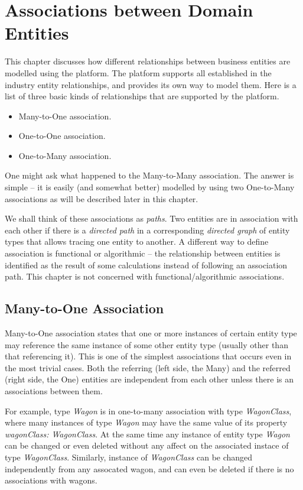\chapter{Associations between Domain Entities}\label{ch01:02}

  This chapter discusses how different relationships between business entities are modelled using the platform.
  The platform supports all established in the industry entity relationships, and provides its own way to model them. 
  Here is a list of three basic kinds of relationships that are supported by the platform.
  \begin{itemize}
    \item Many-to-One association.
    \item One-to-One association.
    \item One-to-Many association.
  \end{itemize}

  One might ask what happened to the Many-to-Many association. 
  The answer is simple -- it is easily (and somewhat better) modelled by using two One-to-Many associations as will be described later in this chapter.

  We shall think of these associations as \emph{paths}.
  Two entities are in association with each other if there is a \emph{directed path} in a corresponding \emph{directed graph} of entity types that allows tracing one entity to another. 
  A different way to define association is functional or algorithmic -- the relationship between entities is identified as the result of some calculations instead of following an association path. 
  This chapter is not concerned with functional/algorithmic associations.  

\section{Many-to-One Association}

  Many-to-One association states that one or more instances of certain entity type may reference the same instance of some other entity type (usually other than that referencing it). 
  This is one of the simplest associations that occurs even in the most trivial cases.
  Both the referring (left side, the Many) and the referred (right side, the One) entities are independent from each other unless there is an associations between them.

  For example, type \emph{Wagon} is in one-to-many association with type \emph{WagonClass}, where many instances of type \emph{Wagon} may have the same value of its property \emph{wagonClass: WagonClass}.
  At the same time any instance of entity type \emph{Wagon} can be changed or even deleted without any affect on the associated instace of type \emph{WagonClass}.
  Similarly, instance of \emph{WagonClass} can be changed independently from any assocated wagon, and can even be deleted if there is no associations with wagons.

